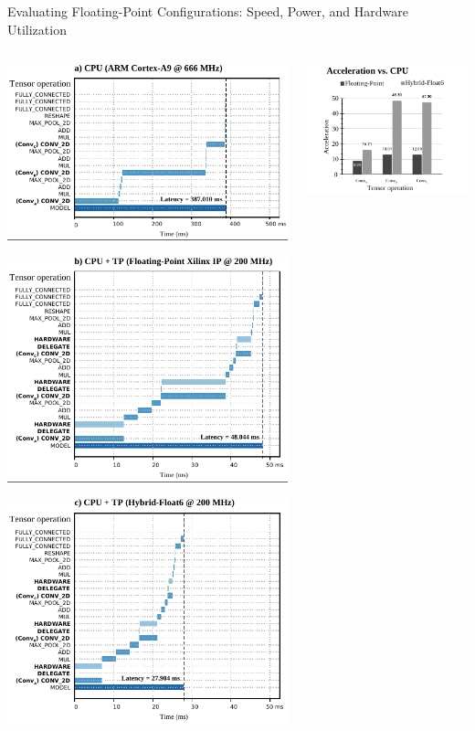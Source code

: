 \begin{frame}{Evaluating Floating-Point Configurations: Speed, Power, and Hardware Utilization}
	\begin{columns}[T] %
		\begin{column}{0.5\textwidth}
			\centering
			\includegraphics[width=0.5\linewidth]{slides/figures/runtime_a.pdf} %
			\pause %
			
			\includegraphics[width=0.5\linewidth]{slides/figures/runtime_b.pdf} %
			\pause %
			
			\includegraphics[width=0.5\linewidth]{slides/figures/runtime_c.pdf} %
			\pause %
		\end{column}
		
		\begin{column}{0.5\textwidth}
			\centering
			\includegraphics[width=0.5\linewidth]{slides/figures/acceleration_vs_cpu.pdf} %
			\pause %
			

\end{column}
\end{columns}
\end{frame}
